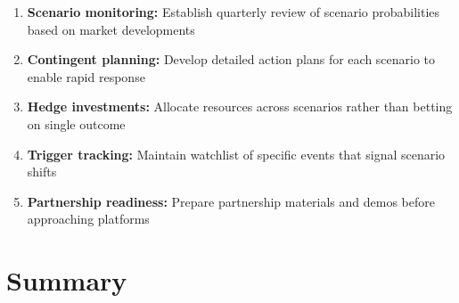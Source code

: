 \begin{tcolorbox}[colback=green!5!white, colframe=green!75!black,
    title=Practical Implications]
\begin{enumerate}
\item \textbf{Scenario monitoring:} Establish quarterly review of scenario
    probabilities based on market developments
\item \textbf{Contingent planning:} Develop detailed action plans for each
    scenario to enable rapid response
\item \textbf{Hedge investments:} Allocate resources across scenarios rather
    than betting on single outcome
\item \textbf{Trigger tracking:} Maintain watchlist of specific events that
    signal scenario shifts
\item \textbf{Partnership readiness:} Prepare partnership materials and demos
    before approaching platforms
\end{enumerate}
\end{tcolorbox}


%
%

\section{Summary}
\label{sec:vvv1-summary}

